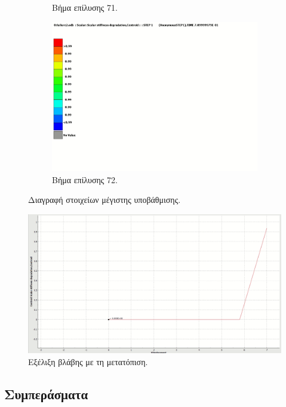 \documentclass{article}
\begin{document}
\begin{figure}[H]
\begin{subfigure}{0.3\linewidth}
        \caption{Βήμα επίλυσης 71.}
        \label{fig:label2}
    \end{subfigure}
    \hfill
    \begin{subfigure}{0.3\linewidth}
        \centering
        \includegraphics[width=\linewidth]{media/sdeg3.png}
        \caption{Βήμα επίλυσης 72.}
        \label{fig:label3}
    \end{subfigure}
    \caption{Διαγραφή στοιχείων μέγιστης υποβάθμισης.}
    \label{fig:steps}
\end{figure}

\begin{figure}[H]
    \centering
    \includegraphics[width=0.7\linewidth]{media/sdeg-u.png}
    \caption{Εξέλιξη βλάβης με τη μετατόπιση.}
    \label{fig:sdegu}
\end{figure}


\subsection{Συμπεράσματα}
\end{document}
